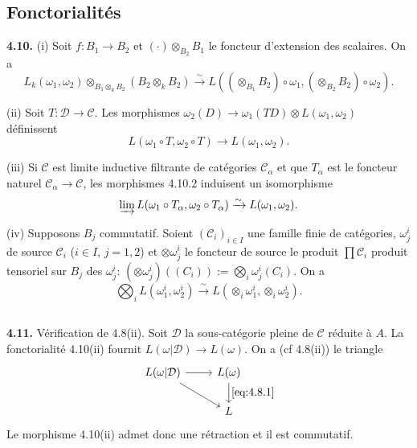 \documentclass[12pt,a4paper]{article}
\theoremstyle{plain}
\theoremstyle{definition}
\theoremstyle{remark}
\begin{document}
\subsection{Fonctorialités}

\textbf{4.10.} (i) Soit $f : B_1 \to B_2$ et $(\cdot) \otimes_{B_2} B_1$ le foncteur d'extension des scalaires. On a
\begin{equation}\label{eq:4.10.1}
L_k(\omega_1, \omega_2) \otimes_{B_1 \otimes_k B_2} (B_2 \otimes_k B_2) \xrightarrow{\sim} L((\otimes_{B_1} B_2) \circ \omega_1, (\otimes_{B_2} B_2) \circ \omega_2).
\end{equation}

(ii) Soit $T : \mathcal{D} \to \mathcal{C}$. Les morphismes $\omega_2(D) \to \omega_1(TD) \otimes L(\omega_1,\omega_2)$ définissent
\begin{equation}\label{eq:4.10.2}
L(\omega_1 \circ T, \omega_2 \circ T) \longrightarrow L(\omega_1,\omega_2).
\end{equation}

(iii) Si $\mathcal{C}$ est limite inductive filtrante de catégories $\mathcal{C}_\alpha$ et que $T_\alpha$ est le foncteur naturel $\mathcal{C}_\alpha \to \mathcal{C}$, les morphismes 4.10.2 induisent un isomorphisme
\begin{equation}\label{eq:4.10.3}
\varinjlim L(\omega_1 \circ T_\alpha, \omega_2 \circ T_\alpha) \xrightarrow{\sim} L(\omega_1,\omega_2).
\end{equation}

(iv) Supposons $B_j$ commutatif. Soient $(\mathcal{C}_i)_{i \in I}$ une famille finie de catégories, $\omega_j^i$ de source $\mathcal{C}_i$ ($i \in I$, $j = 1,2$) et $\otimes \omega_j^i$ le foncteur de source le produit $\prod \mathcal{C}_i$ produit tensoriel sur $B_j$ des $\omega_j^i$: $(\otimes \omega_j^i)((C_i)) := \bigotimes_i \omega_j^i(C_i)$. On a
\[
\bigotimes_i L(\omega_1^i, \omega_2^i) \xrightarrow{\sim} L(\otimes_i \omega_1^i, \otimes_i \omega_2^i).
\]

\subsection{}

\textbf{4.11.} Vérification de 4.8(ii). Soit $\mathcal{D}$ la sous-catégorie pleine de $\mathcal{C}$ réduite à $A$. La fonctorialité 4.10(ii) fournit $L(\omega|\mathcal{D}) \to L(\omega)$. On a (cf 4.8(ii)) le triangle
\[
\begin{tikzcd}
L(\omega|\mathcal{D}) \arrow[r] \arrow[rd] & L(\omega) \arrow[d, "\eqref{eq:4.8.1}"] \\
& L
\end{tikzcd}
\]
Le morphisme 4.10(ii) admet donc une rétraction et il est commutatif.
\end{document}

